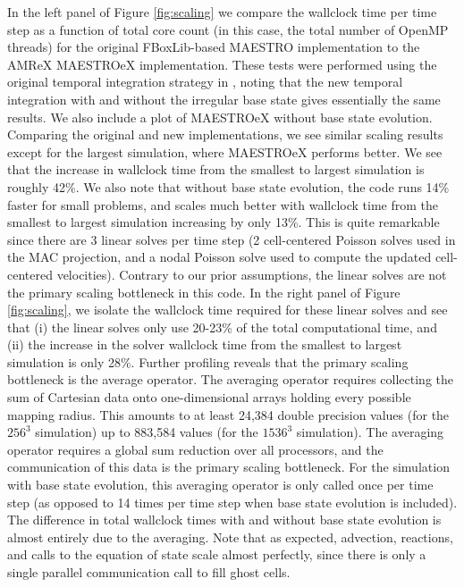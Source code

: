 \documentclass{aastex62}
\begin{document}
In the left panel of Figure \ref{fig:scaling} we compare the wallclock time per time step as a function of total core count (in this case, the total number of OpenMP threads) for the original FBoxLib-based MAESTRO implementation to the AMReX MAESTROeX implementation.
These tests were performed using the original temporal integration strategy in \cite{MAESTRO_V}, noting that the new temporal integration with and without the irregular base state gives essentially the same results.
We also include a plot of MAESTROeX without base state evolution.
Comparing the original and new implementations, we see similar scaling results except for the largest simulation, where MAESTROeX performs better.
We see that the increase in wallclock time from the smallest to largest simulation is roughly 42\%.
We also note that without base state evolution, the code runs 14\% faster for small problems, and scales much better with wallclock time from the smallest to largest simulation increasing by only 13\%.
This is quite remarkable since there are 3 linear solves per time step (2 cell-centered Poisson solves used in the MAC projection, and a nodal Poisson solve used to compute the updated cell-centered velocities).
Contrary to our prior assumptions, the linear solves are not the primary scaling bottleneck in this code.
In the right panel of Figure \ref{fig:scaling}, we isolate the wallclock time required for these linear solves and see that (i) the linear solves only use 20-23\% of the total computational time, and (ii) the increase in the solver wallclock time from the smallest to largest simulation is only 28\%.
Further profiling reveals that the primary scaling bottleneck is the average operator.
The averaging operator requires collecting the sum of Cartesian data onto one-dimensional arrays holding every possible mapping radius.
This amounts to at least 24,384 double precision values (for the $256^3$ simulation) up to 883,584 values (for the $1536^3$ simulation).
The averaging operator requires a global sum reduction over all processors, and the communication of this data is the primary scaling bottleneck.
For the simulation with base state evolution, this averaging operator is only called once per time step (as opposed to 14 times per time step when base state evolution is included).
The difference in total wallclock times with and without base state evolution is almost entirely due to the averaging.
Note that as expected, advection, reactions, and calls to the equation of state scale almost perfectly, since there is only a single parallel communication call to fill ghost cells.
\end{document}
